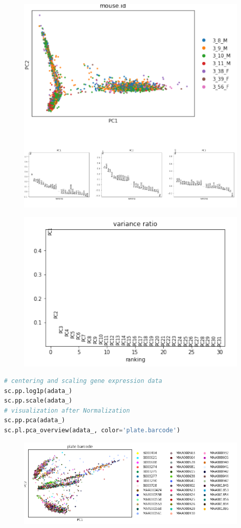 \documentclass{article}
\begin{document}
\begin{figure}
      \centering
      \includegraphics{8.png}
        \end{figure}
\begin{figure}
      \centering
      \includegraphics{9.png}
        \end{figure}
\begin{lstlisting}[language=python]
        # centering and scaling gene expression data
sc.pp.log1p(adata_)
sc.pp.scale(adata_)
# visualization after Normalization
sc.pp.pca(adata_)
sc.pl.pca_overview(adata_, color='plate.barcode')
\end{lstlisting}
\begin{figure}
    \centering
    \includegraphics{10.png}
\end{figure}        
\end{document}
